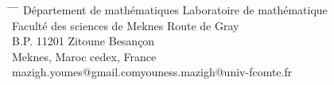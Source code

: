 \documentclass[reqno]{amsart}
\begin{document}
\begin{tabbing}
  \hspace{6cm}\=\hspace{3cm} \= \hspace{5cm} \= \kill
Département de mathématiques\>  \> Laboratoire de mathématique\\
Faculté des sciences de Meknes\>  Route de Gray\\
B.P. 11201 Zitoune\>   Besançon\\
Meknes, Maroc\>  \> cedex, France\\
 mazigh.younes@gmail.com\>\>youness.mazigh@univ-fcomte.fr
  \end{tabbing}
\end{document}
